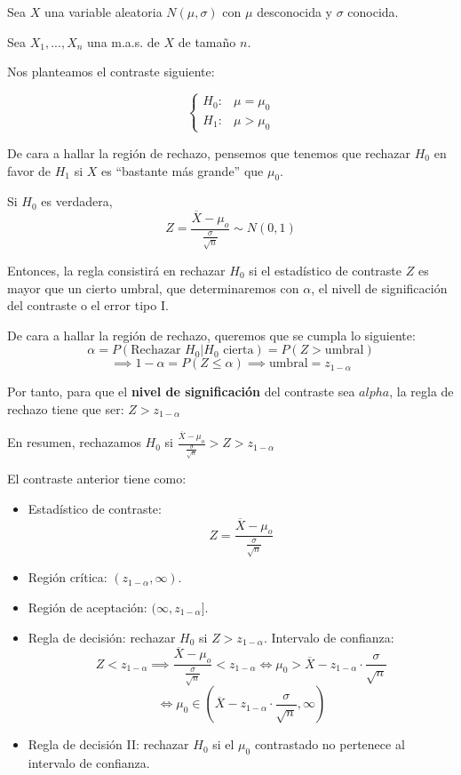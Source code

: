 \documentclass[
]{article}
\providecommand{\tightlist}{%
  \setlength{\itemsep}{0pt}\setlength{\parskip}{0pt}}
\begin{document}
Sea \(X\) una variable aleatoria \(N(\mu,\sigma)\) con \(\mu\)
desconocida y \(\sigma\) conocida.

Sea \(X_1,...,X_n\) una m.a.s. de \(X\) de tamaño \(n\).

Nos planteamos el contraste siguiente:

\[
\begin{cases}
H_0 : & \mu = \mu_0\\
H_1 : & \mu > \mu_0
\end{cases}
\]

De cara a hallar la región de rechazo, pensemos que tenemos que rechazar
\(H_0\) en favor de \(H_1\) si \(X\) es ``bastante más grande'' que
\(\mu_0\).

Si \(H_0\) es verdadera,
\[Z = \frac{\overline{X}-\mu_o}{\frac{\sigma}{\sqrt{n}}} \sim N(0,1)\]

Entonces, la regla consistirá en rechazar \(H_0\) si el estadístico de
contraste \(Z\) es mayor que un cierto umbral, que determinaremos con
\(\alpha\), el nivell de significación del contraste o el error tipo I.

De cara a hallar la región de rechazo, queremos que se cumpla lo
siguiente:
\[\alpha = P(\text{Rechazar }H_0|H_0\text{ cierta}) = P(Z > \text{umbral})\]
\[\implies 1-\alpha = P(Z \leq \alpha) \implies \text{umbral} = z_{1-\alpha}\]

Por tanto, para que el \textbf{nivel de significación} del contraste sea
\(alpha\), la regla de rechazo tiene que ser: \(Z > z_{1-\alpha}\)

En resumen, rechazamos \(H_0\) si
\(\frac{\overline{X}-\mu_o}{\frac{\sigma}{\sqrt{n}}} > Z > z_{1-\alpha}\)

El contraste anterior tiene como:

\begin{itemize}
\tightlist
\item
  Estadístico de contraste:
  \[Z = \frac{\overline{X}-\mu_o}{\frac{\sigma}{\sqrt{n}}}\]
\item
  Región crítica: \((z_{1-\alpha}, \infty)\).
\item
  Región de aceptación: \((\infty, z_{1-\alpha}]\).
\item
  Regla de decisión: rechazar \(H_0\) si \(Z > z_{1-\alpha}\). Intervalo
  de confianza:
  \[Z < z_{1-\alpha} \implies \frac{\overline{X}-\mu_o}{\frac{\sigma}{\sqrt{n}}} < z_{1-\alpha} \Leftrightarrow \mu_0 > \overline{X}-z_{1-\alpha} \cdot \frac{\sigma}{\sqrt{n}}\]
  \[\Leftrightarrow \mu_0 \in (\overline{X}-z_{1-\alpha} \cdot \frac{\sigma}{\sqrt{n}}, \infty)\]
\item
  Regla de decisión II: rechazar \(H_0\) si el \(\mu_0\) contrastado no
  pertenece al intervalo de confianza.
\end{itemize}
\end{document}
